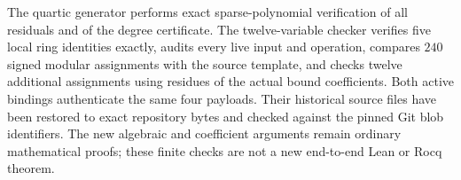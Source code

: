The quartic generator performs exact sparse-polynomial verification of
all residuals and of the degree certificate.  The twelve-variable checker
verifies five local ring identities exactly, audits every live input and
operation, compares $240$ signed modular assignments with the source
template, and checks twelve additional assignments using residues of the
actual bound coefficients.  Both active bindings authenticate the same
four payloads.  Their historical source files have been restored to exact
repository bytes and checked against the pinned Git blob identifiers.
The new algebraic and coefficient arguments remain ordinary mathematical
proofs; these finite checks are not a new end-to-end Lean or Rocq theorem.
